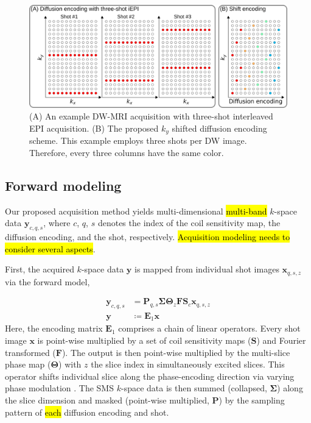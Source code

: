 \documentclass[preprint,12pt,authoryear,review]{elsarticle}
\begin{document}
    \begin{figure}
        \centering
        \includegraphics[width=\linewidth]{../figures/fig1.png}
        \caption{(A) An example DW-MRI acquisition
        with three-shot interleaved EPI acquisition.
        (B) The proposed $k_y$ shifted diffusion encoding scheme.
        This example employs three shots per DW image.
        Therefore, every three columns have the same color.}
        \label{FIG:sampling}
    \end{figure}

    \pagebreak

    \subsection{Forward modeling}
    Our proposed acquisition method yields
    multi-dimensional \hl{multi-band} 
    $k$-space data $\mathbf{y}_{c,q,s}$,
    where $c$, $q$, $s$ denotes the index of the coil sensitivity map,
    the diffusion encoding, and the shot, respectively.
    \hl{Acquisition modeling needs to consider several aspects}.

    First, the acquired $k$-space data $\mathbf{y}$ is mapped from
    individual shot images $\mathbf{x}_{q,s,z}$ via the forward model,

    \begin{align}
        \mathbf{y}_{c,q,s} &= \mathbf{P}_{q,s} \mathbf{\Sigma} \mathbf{\Theta}_{z} \mathbf{F} \mathbf{S}_c \mathbf{x}_{q,s,z} \nonumber \\
        \mathbf{y} &\coloneqq \mathbf{E}_1 \mathbf{x} \label{EQU:model_shot}
    \end{align}
    Here, the encoding matrix $\mathbf{E}_1$ comprises
    a chain of linear operators.
    Every shot image $\mathbf{x}$ is point-wise multiplied
    by a set of coil sensitivity maps ($\mathbf{S}$) and Fourier transformed ($\mathbf{F}$).
    The output is then point-wise multiplied by the multi-slice phase map ($\mathbf{\Theta}$)
    with $z$ the slice index in simultaneously excited slices.
    This operator shifts individual slice
    along the phase-encoding direction
    via varying phase modulation \citep{breuer_2005_caipi}.
    The SMS $k$-space data is then
    summed (collapsed, $\mathbf{\Sigma}$) along the slice dimension and
    masked (point-wise multiplied, $\mathbf{P}$) by
    the sampling pattern of \hl{each} diffusion encoding and shot.
\end{document}
